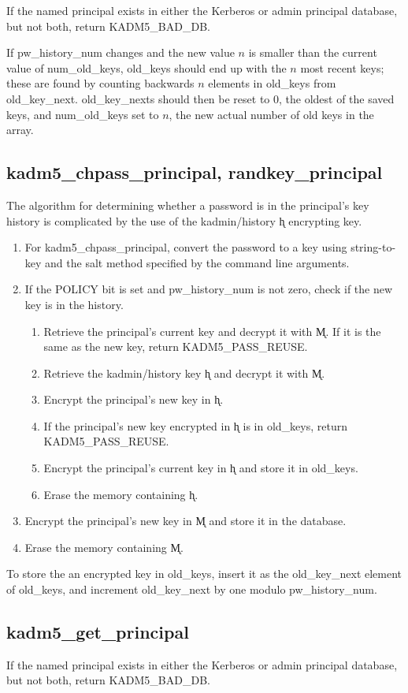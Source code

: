 If the named principal exists in either the Kerberos or admin
principal database, but not both, return KADM5_BAD_DB.

If pw_history_num changes and the new value $n$ is smaller than the
current value of num_old_keys, old_keys should end up with the $n$
most recent keys; these are found by counting backwards $n$ elements
in old_keys from old_key_next.  old_key_nexts should then be reset to
0, the oldest of the saved keys, and num_old_keys set to $n$, the
new actual number of old keys in the array.  

\subsection{kadm5_chpass_principal, randkey_principal}

The algorithm for determining whether a password is in the principal's
key history is complicated by the use of the kadmin/history \k{h}
encrypting key.  

\begin{enumerate}
\item For kadm5_chpass_principal, convert the password to a key
using string-to-key and the salt method specified by the command line
arguments.

\item If the POLICY bit is set and pw_history_num is not zero, check
if the new key is in the history.
\begin{enumerate}
\item Retrieve the principal's current key and decrypt it with \k{M}.
If it is the same as the new key, return KADM5_PASS_REUSE.
\item Retrieve the kadmin/history key \k{h} and decrypt it with \k{M}.
\item Encrypt the principal's new key in \k{h}.
\item If the principal's new key encrypted in \k{h} is in old_keys,
return KADM5_PASS_REUSE.
\item Encrypt the principal's current key in \k{h} and store it in
old_keys.
\item Erase the memory containing \k{h}.
\end{enumerate}

\item Encrypt the principal's new key in \k{M} and store it in the
database.
\item Erase the memory containing \k{M}.
\end{enumerate}

To store the an encrypted key in old_keys, insert it as the
old_key_next element of old_keys, and increment old_key_next by one
modulo pw_history_num.

\subsection{kadm5_get_principal}

If the named principal exists in either the Kerberos or admin
principal database, but not both, return KADM5_BAD_DB.


